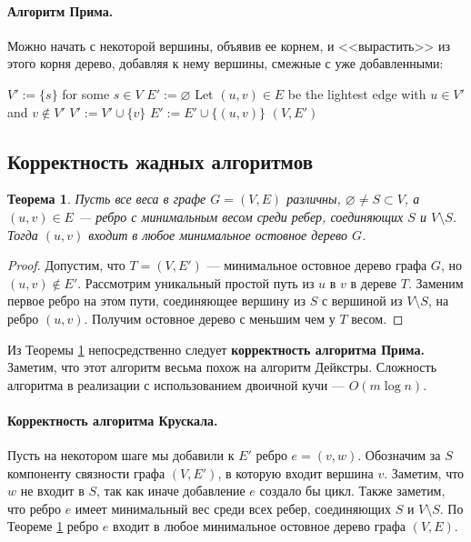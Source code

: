 \documentclass[a4paper,12pt]{article}
\newtheorem*{theorem}{Теорема}
\begin{document}
\paragraph{Алгоритм Прима.} Можно начать с некоторой вершины, объявив ее корнем, и <<вырастить>> из этого корня дерево, добавляя к нему вершины, смежные с уже добавленными:

\begin{algorithmic}
	\State $V' := \{s\}$ for some $s \in V$
	\State $E' := \varnothing$
		\State Let $(u, v) \in E$ be the lightest edge with $u \in V'$ and $v \not\in V'$
		\State $V' := V' \cup \{v\}$
		\State $E' := E' \cup \{(u, v)\}$
	\EndWhile
	\Return $(V, E')$
\end{algorithmic}

\subsection{Корректность жадных алгоритмов}

	\begin{theorem}\label{theorem:cut}
		Пусть все веса в графе $G = (V, E)$ различны, $\varnothing \neq S \subset V$, а $(u, v) \in E$ --- ребро с минимальным весом среди ребер, соединяющих $S$ и $V \setminus S$. Тогда $(u, v)$ входит в любое минимальное остовное дерево $G$.
	\end{theorem}
	\begin{proof}
		Допустим, что $T = (V, E')$ --- минимальное остовное дерево графа $G$, но $(u, v) \not\in E'$. Рассмотрим уникальный простой путь из $u$ в $v$ в дереве $T$. Заменим первое ребро на этом пути, соединяющее вершину из $S$ с вершиной из $V \setminus S$, на ребро $(u, v)$. Получим остовное дерево с меньшим чем у $T$ весом.
	\end{proof}

Из Теоремы \ref{theorem:cut} непосредственно следует \textbf{корректность алгоритма Прима.} Заметим, что этот алгоритм весьма похож на алгоритм Дейкстры. Сложность алгоритма в реализации с использованием двоичной кучи --- $O(m\log n)$.

\paragraph{Корректность алгоритма Крускала.} Пусть на некотором шаге мы добавили к $E'$ ребро $e = (v, w)$. Обозначим за $S$ компоненту связности графа $(V, E')$, в которую входит вершина $v$. Заметим, что $w$ не входит в $S$, так как иначе добавление $e$ создало бы цикл. Также заметим, что ребро $e$ имеет минимальный вес среди всех ребер, соединяющих  $S$ и $V \setminus S$. По Теореме \ref{theorem:cut} ребро $e$ входит в любое минимальное остовное дерево графа $(V, E)$.
\end{document}
